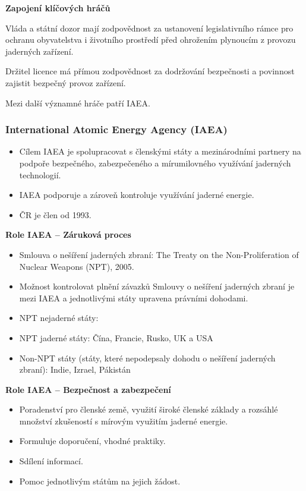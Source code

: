 \textbf{Zapojení klíčových hráčů}

Vláda a státní dozor mají zodpovědnost za ustanovení legislativního rámce pro ochranu obyvatelstva i životního prostředí před ohrožením plynoucím z provozu jaderných zařízení.

Držitel licence má přímou zodpovědnost za dodržování bezpečnosti a povinnost zajistit bezpečný provoz zařízení.

Mezi další významné hráče patří IAEA.

\subsubsection{International Atomic Energy Agency (IAEA)}

\begin{itemize}
    \item Cílem IAEA je spolupracovat s členskými státy a mezinárodními partnery na podpoře bezpečného, zabezpečeného a mírumilovného využívání jaderných technologií.
    \item IAEA podporuje a zároveň kontroluje využívání jaderné energie.
    \item ČR je člen od 1993.
\end{itemize}

\textbf{Role IAEA -- Záruková proces}

\begin{itemize}
    \item Smlouva o nešíření jaderných zbraní: The Treaty on the Non-Proliferation of Nuclear Weapons (NPT), 2005.
    \item Možnost kontrolovat plnění závazků Smlouvy o nešíření jaderných zbraní je mezi IAEA a jednotlivými státy upravena právními dohodami.
    \item NPT nejaderné státy:
    \item NPT jaderné státy: Čína, Francie, Rusko, UK a USA
    \item Non-NPT státy (státy, které nepodepsaly dohodu o nešíření jaderných zbraní): Indie, Izrael, Pákistán
\end{itemize}

\textbf{Role IAEA -- Bezpečnost a zabezpečení}

\begin{itemize}
    \item	Poradenství pro členské země, využití široké členské základy a rozsáhlé množství zkušeností s mírovým využitím jaderné energie.
    \item	Formuluje doporučení, vhodné praktiky.
    \item	Sdílení informací.
    \item	Pomoc jednotlivým státům na jejich žádost.
\end{itemize}

